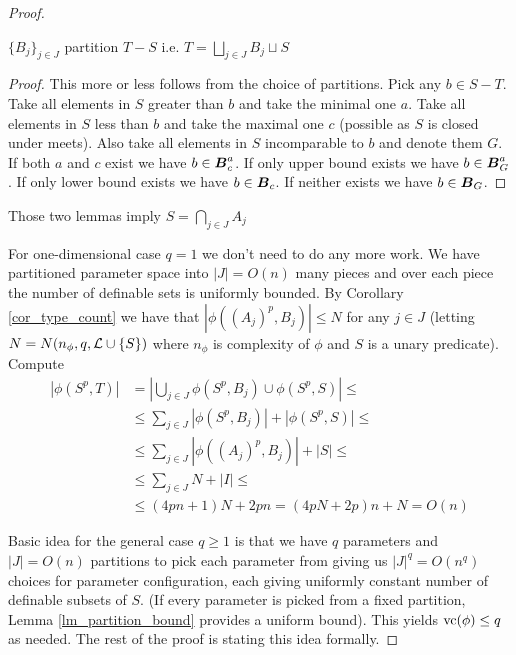 \documentclass{amsart}
\DeclareMathOperator{\B}{\boldface B}
\begin{document}
\begin{proof}
	\begin{Lemma}
		$\{B_j\}_{j \in J}$ partition $T - S$ i.e. $T = \bigsqcup_{j \in J} B_j \sqcup S$
	\end{Lemma}
	
	\begin{proof}
		This more or less follows from the choice of partitions. Pick any $b \in S - T$. Take all elements in $S$ greater than $b$ and take the minimal one $a$. Take all elements in $S$ less than $b$ and take the maximal one $c$ (possible as $S$ is closed under meets). Also take all elements in $S$ incomparable to $b$ and denote them $G$. If both $a$ and $c$ exist we have $b \in \B^a_c$. If only upper bound exists we have $b \in \B^a_G$. If only lower bound exists we have $b \in \B_c$. If neither exists we have $b \in \B_G$.
	\end{proof}
	
	\begin{Note}
		Those two lemmas imply $S = \bigcap_{j \in J} A_j$
	\end{Note}
	
	\begin{Note}
		For one-dimensional case $q = 1$ we don't need to do any more work. We have partitioned parameter space into $|J| = O(n)$ many pieces and over each piece the number of definable sets is uniformly bounded. By Corollary \ref{cor_type_count} we have that $|\phi((A_j)^p, B_j)| \leq N$ for any $j \in J$ (letting $N = N(n_\phi, q, \mathcal L \cup \{S\})$ where $n_\phi$ is complexity of $\phi$ and $S$ is a unary predicate). Compute
		\begin{align*}
			|\phi(S^p, T)|
			&= \left|\bigcup_{j \in J} \phi(S^p, B_j) \cup \phi(S^p, S)\right| \leq \\
			&\leq \sum_{j \in J} |\phi(S^p, B_j)| + |\phi(S^p, S)| \leq \\
			&\leq \sum_{j \in J} |\phi((A_j)^p, B_j)| + |S| \leq \\
			&\leq \sum_{j \in J}N + |I| \leq \\
			&\leq (4pn + 1)N + 2pn = (4pN + 2p)n + N = O(n)
		\end{align*}
	\end{Note}
	Basic idea for the general case $q \geq 1$ is that we have $q$ parameters and $|J| = O(n)$ partitions to pick each parameter from giving us $|J|^q = O(n^q)$ choices for parameter configuration, each giving uniformly constant number of definable subsets of $S$. (If every parameter is picked from a fixed partition, Lemma \ref{lm_partition_bound} provides a uniform bound). This yields $\operatorname{vc}(\phi) \leq q$ as needed. The rest of the proof is stating this idea formally.
	

\end{proof}
\end{document}
